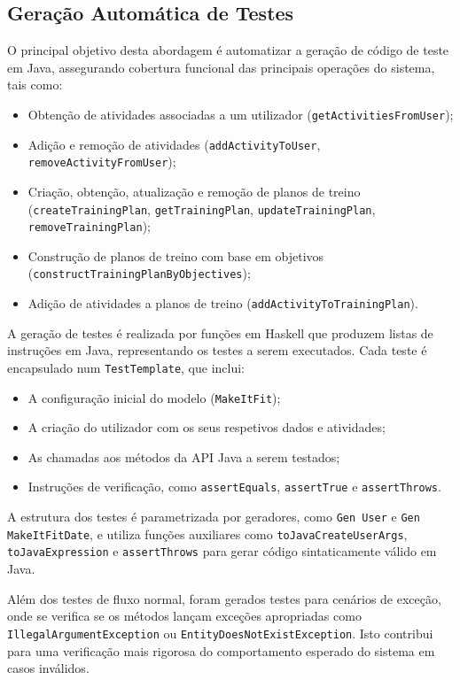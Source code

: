 \documentclass[12pt, a4paper]{article}
\begin{document}
\subsection{Geração Automática de Testes}

O principal objetivo desta abordagem é automatizar a geração de código de teste em Java, assegurando
cobertura funcional das principais operações do sistema, tais como:

\begin{itemize}
  \item Obtenção de atividades associadas a um utilizador (\texttt{getActivitiesFromUser});
  \item Adição e remoção de atividades (\texttt{addActivityToUser},
  \texttt{removeActivityFromUser});
  \item Criação, obtenção, atualização e remoção de planos de treino (\texttt{createTrainingPlan},
  \texttt{getTrainingPlan}, \texttt{updateTrainingPlan}, \texttt{removeTrainingPlan});
  \item Construção de planos de treino com base em objetivos
  (\texttt{constructTrainingPlanByObjectives});
  \item Adição de atividades a planos de treino (\texttt{addActivityToTrainingPlan}).
\end{itemize}

A geração de testes é realizada por funções em Haskell que produzem listas de instruções em Java,
representando os testes a serem executados. Cada teste é encapsulado num \texttt{TestTemplate}, que
inclui:

\begin{itemize}
  \item A configuração inicial do modelo (\texttt{MakeItFit});
  \item A criação do utilizador com os seus respetivos dados e atividades;
  \item As chamadas aos métodos da API Java a serem testados;
  \item Instruções de verificação, como \texttt{assertEquals}, \texttt{assertTrue} e
  \texttt{assertThrows}.
\end{itemize}

A estrutura dos testes é parametrizada por geradores, como \texttt{Gen User} e
\texttt{Gen MakeItFitDate}, e utiliza funções auxiliares como \texttt{toJavaCreateUserArgs},
\texttt{toJavaExpression} e \texttt{assertThrows} para gerar código sintaticamente válido em Java.

Além dos testes de fluxo normal, foram gerados testes para cenários de exceção, onde se verifica se
os métodos lançam exceções apropriadas como \texttt{IllegalArgumentException} ou
\texttt{EntityDoesNotExistException}. Isto contribui para uma verificação mais rigorosa do
comportamento esperado do sistema em casos inválidos.
\end{document}
